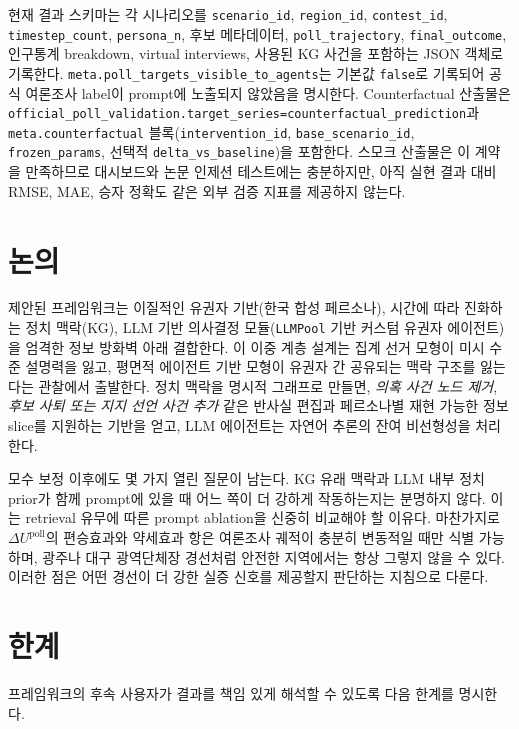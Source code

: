 \documentclass[11pt]{article}
\begin{document}
현재 결과 스키마는 각 시나리오를 \texttt{scenario\_id}, \texttt{region\_id}, \texttt{contest\_id}, \texttt{timestep\_count}, \texttt{persona\_n}, 후보 메타데이터, \texttt{poll\_trajectory}, \texttt{final\_outcome}, 인구통계 breakdown, virtual interviews, 사용된 KG 사건을 포함하는 JSON 객체로 기록한다. \texttt{meta.poll\_targets\_visible\_to\_agents}는 기본값 \texttt{false}로 기록되어 공식 여론조사 label이 prompt에 노출되지 않았음을 명시한다. Counterfactual 산출물은 \texttt{official\_poll\_validation.target\_series=counterfactual\_prediction}과 \texttt{meta.counterfactual} 블록(\texttt{intervention\_id}, \texttt{base\_scenario\_id}, \texttt{frozen\_params}, 선택적 \texttt{delta\_vs\_baseline})을 포함한다. 스모크 산출물은 이 계약을 만족하므로 대시보드와 논문 인제션 테스트에는 충분하지만, 아직 실현 결과 대비 RMSE, MAE, 승자 정확도 같은 외부 검증 지표를 제공하지 않는다.

\section{논의}

제안된 프레임워크는 이질적인 유권자 기반(한국 합성 페르소나), 시간에 따라 진화하는 정치 맥락(KG), LLM 기반 의사결정 모듈(\texttt{LLMPool} 기반 커스텀 유권자 에이전트)을 엄격한 정보 방화벽 아래 결합한다. 이 이중 계층 설계는 집계 선거 모형이 미시 수준 설명력을 잃고, 평면적 에이전트 기반 모형이 유권자 간 공유되는 맥락 구조를 잃는다는 관찰에서 출발한다. 정치 맥락을 명시적 그래프로 만들면, \emph{의혹 사건 노드 제거}, \emph{후보 사퇴 또는 지지 선언 사건 추가} 같은 반사실 편집과 페르소나별 재현 가능한 정보 slice를 지원하는 기반을 얻고, LLM 에이전트는 자연어 추론의 잔여 비선형성을 처리한다.

모수 보정 이후에도 몇 가지 열린 질문이 남는다. KG 유래 맥락과 LLM 내부 정치 prior가 함께 prompt에 있을 때 어느 쪽이 더 강하게 작동하는지는 분명하지 않다. 이는 retrieval 유무에 따른 prompt ablation을 신중히 비교해야 할 이유다. 마찬가지로 $\Delta U^{\text{poll}}$의 편승효과와 약세효과 항은 여론조사 궤적이 충분히 변동적일 때만 식별 가능하며, 광주나 대구 광역단체장 경선처럼 안전한 지역에서는 항상 그렇지 않을 수 있다. 이러한 점은 어떤 경선이 더 강한 실증 신호를 제공할지 판단하는 지침으로 다룬다.

\section{한계}
\label{sec:limitations}

프레임워크의 후속 사용자가 결과를 책임 있게 해석할 수 있도록 다음 한계를 명시한다.
\end{document}
